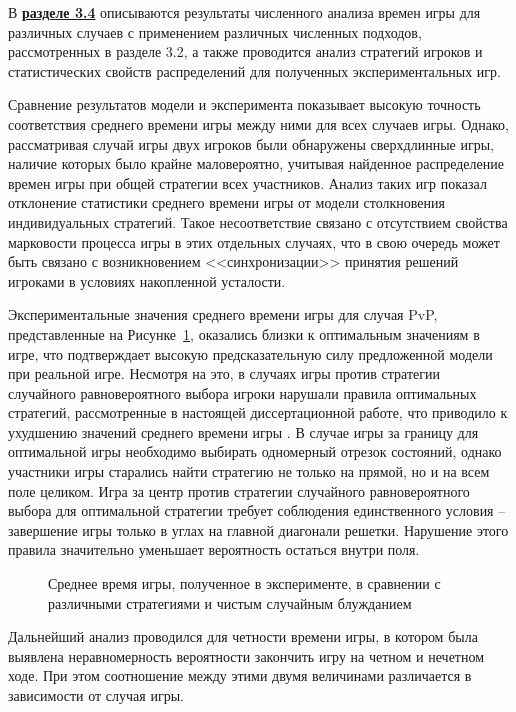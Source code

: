 В \underline{\textbf{разделе 3.4}} описываются результаты численного анализа времен игры для различных случаев с применением различных численных подходов, рассмотренных в разделе 3.2, а также проводится анализ стратегий игроков и статистических свойств распределений для полученных экспериментальных игр. 

Сравнение результатов модели и эксперимента показывает высокую точность соответствия среднего времени игры между ними для всех случаев игры. Однако, рассматривая случай игры двух игроков были обнаружены сверхдлинные игры, наличие которых было крайне маловероятно, учитывая найденное распределение времен игры при общей стратегии всех участников. Анализ таких игр показал отклонение статистики среднего времени игры от модели столкновения индивидуальных стратегий. Такое несоответствие связано с отсутствием свойства марковости процесса игры в этих отдельных случаях, что в свою очередь может быть связано с возникновением <<синхронизации>> принятия решений игроками в условиях накопленной усталости.

Экспериментальные значения среднего времени игры для случая PvP, представленные на Рисунке~\cref{fig:mean-times}, оказались близки к оптимальным значениям в игре, что подтверждает высокую предсказательную силу предложенной модели при реальной игре. Несмотря на это, в случаях игры против стратегии случайного равновероятного выбора игроки нарушали правила оптимальных стратегий, рассмотренные в настоящей диссертационной работе, что приводило к ухудшению значений среднего времени игры \cite{confbib4}. В случае игры за границу для оптимальной игры необходимо выбирать одномерный отрезок состояний, однако участники игры старались найти стратегию не только на прямой, но и на всем поле целиком. Игра за центр против стратегии случайного равновероятного выбора для оптимальной стратегии требует соблюдения единственного условия -- завершение игры только в углах на главной диагонали решетки. Нарушение этого правила значительно уменьшает вероятность остаться внутри поля. 

\begin{figure}[ht]
    \caption{
        Среднее время игры, полученное в эксперименте, в сравнении с различными стратегиями и чистым случайным блужданием
    }  
    \label{fig:mean-times}
\end{figure}

Дальнейший анализ проводился для четности времени игры, в котором была выявлена неравномерность вероятности закончить игру на четном и нечетном ходе. При этом соотношение между этими двумя величинами различается в зависимости от случая игры. 

